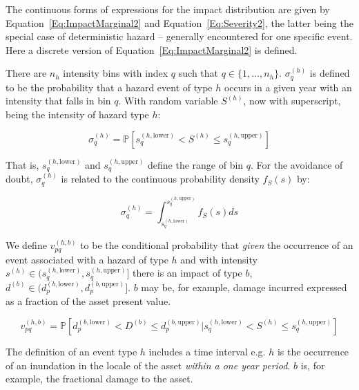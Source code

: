 \documentclass[a4paper,11pt]{extarticle} %
\theoremstyle{definition}
\begin{document}
The continuous forms of expressions for the impact distribution are given by Equation~\ref{Eq:ImpactMarginal2} and Equation~\ref{Eq:Severity2}, the latter being the special case of deterministic hazard -- generally encountered for one specific event. Here a discrete version of Equation~\ref{Eq:ImpactMarginal2} is defined.

There are $n_h$ intensity bins with index $q$ such that $q \in \{1, \dots, n_h \}$.  $\sigma^{(h)}_q$ is defined to be the probability that a hazard event of type $h$ occurs in a given year with an intensity that falls in bin $q$. With random variable $S^{(h)}$, now with superscript, being the intensity of hazard type $h$:

\begin{equation}
    \label{Eq:Discrete1}
    \sigma^{(h)}_q = \mathbb{P} \left[ s^{(h, \text{lower})}_q < S^{(h)} \le s^{(h, \text{upper})}_q \right]
\end{equation}

That is, $s^{(h, \text{lower})}_q$ and $s^{(h, \text{upper})}_q$ define the range of bin $q$. For the avoidance of doubt, $\sigma^{(h)}_q$ is related to the continuous probability density $f_S(s)$ by:

\begin{equation}
    \label{Eq:Discrete2}
    \sigma^{(h)}_q = \int_ {s^{(h, \text{lower})}_q}^{s^{(h, \text{upper})}_q} f_S(s) ds
\end{equation}

We define $v^{(h, b)}_{pq}$ to be the conditional probability that \emph{given} the occurrence of an event associated with a hazard of type $h$ and with intensity $s^{(h)} \in (s^{(h, \text{lower})}_q, s^{(h, \text{upper})}_q]$ there is an impact of type $b$, $d^{(b)} \in (d^{(b,\text{lower})}_p, d^{(b,\text{upper})}_p]$. $b$ may be, for example, damage incurred expressed as a fraction of the asset present value.


\begin{equation}
    \label{Eq:vulnerability}
    v^{(h, b)}_{pq} = \mathbb{P} \left[ d^{(b,\text{lower})}_p < D^{(b)} \le d^{(b,\text{upper})}_p | s^{(h, \text{lower})}_q < S^{(h)} \le s^{(h, \text{upper})}_q \right]
\end{equation}

The definition of an event type $h$ includes a time interval e.g. $h$ is the occurrence of an inundation in the locale of the asset {\it within a one year period}. $b$ is, for example, the fractional damage to the asset.
\end{document}
